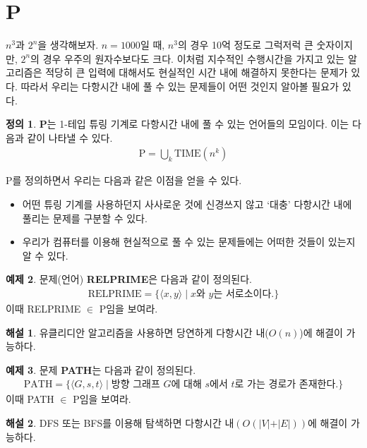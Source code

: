 \documentclass[b5paper, 11pt]{book}
\theoremstyle{definition}
\newtheorem{defn}{정의}[chapter]
\newtheorem{ex}[defn]{예제}
\newtheorem*{ans*}{해설}
\begin{document}
\section{P}
$n^3$과 $2^n$을 생각해보자. $n=1000$일 때, $n^3$의 경우 10억 정도로 그럭저럭 큰 숫자이지만, $2^n$의 경우 우주의 원자수보다도 크다. 이처럼 지수적인 수행시간을 가지고 있는 알고리즘은 적당히 큰 입력에 대해서도 현실적인 시간 내에 해결하지 못한다는 문제가 있다. 따라서 우리는 다항시간 내에 풀 수 있는 문제들이 어떤 것인지 알아볼 필요가 있다.
\begin{defn}
    \textbf{P}는 1-테입 튜링 기계로 다항시간 내에 풀 수 있는 언어들의 모임이다. 이는 다음과 같이 나타낼 수 있다.
    \begin{align*}
        \text{P} = \bigcup_k \text{TIME}(n^k)
    \end{align*}
\end{defn} 
P를 정의하면서 우리는 다음과 같은 이점을 얻을 수 있다.
\begin{itemize}
    \item 어떤 튜링 기계를 사용하던지 사사로운 것에 신경쓰지 않고 `대충' 다항시간 내에 풀리는 문제를 구분할 수 있다.
    \item 우리가 컴퓨터를 이용해 현실적으로 풀 수 있는 문제들에는 어떠한 것들이 있는지 알 수 있다. 
\end{itemize}
\begin{ex}
    문제(언어) \textbf{RELPRIME}은 다음과 같이 정의된다. 
    \begin{align*}
        \text{RELPRIME} = \{\langle x,y \rangle  \;\vert\; x\text{와 } y\text{는 서로소이다.}\}
    \end{align*}
    이때 RELPRIME $\in $ P임을 보여라.  
\end{ex}
\begin{ans*}
    유클리디안 알고리즘을 사용하면 당연하게 다항시간 내($O(n)$)에 해결이 가능하다. 
\end{ans*}
\begin{ex}\label{PATH}
    문제 \textbf{PATH}는 다음과 같이 정의된다.
    \begin{align*}
        \text{PATH}= \{\langle G, s, t \rangle \;\vert\; \text{방향 그래프 } G\text{에 대해 }s \text{에서 }t\text{로 가는 경로가 존재한다.}\}
    \end{align*}
    이때 PATH $\in $ P임을 보여라.
\end{ex}
\begin{ans*}
    DFS 또는 BFS를 이용해 탐색하면 다항시간 내$(O(\vert V \vert + \vert E \vert))$에 해결이 가능하다. 
\end{ans*}
\end{document}

